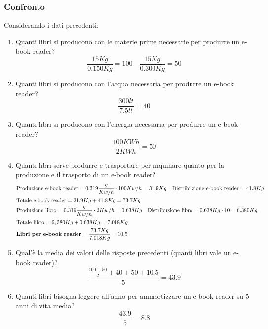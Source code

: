 \subsubsection{Confronto}
Considerando i dati precedenti:
\begin{enumerate}
	\item Quanti libri si producono con le materie prime necessarie per produrre un e-book reader?\\
	\begin{equation*}
		\frac{15Kg}{0.150Kg} = 100 \quad \frac{15Kg}{0.300Kg}=50
	\end{equation*}
	\item Quanti libri si producono con l'acqua necessaria per produrre un e-book reader?\\
	\begin{equation*}
		\frac{300lt}{7.5lt} = 40
	\end{equation*}
	\item Quanti libri si producono con l'energia necessaria per produrre un e-book reader?\\
	\begin{equation*}
		\frac{100KWh}{2KWh} = 50
	\end{equation*}
	\item Quanti libri serve produrre e trasportare per inquinare quanto per la produzione e il trasporto di un e-book reader?\\
	\begin{equation*}
		\begin{split}
			&\text{Produzione e-book reader}=0.319\frac{g}{Kw/h} \cdot 100Kw/h = 31.9Kg \quad \text{Distribuzione e-book reader}=41.8 Kg \\
			&\text{Totale e-book reader}=31.9Kg + 41.8Kg = 73.7 Kg \\
			&\text{Produzione libro}=0.319 \frac{g}{Kw/h} \cdot 2Kw/h = 0.638Kg \quad  \text{Distribuzione libro}= 0.638Kg \cdot 10 = 6.380Kg\\
			&\text{Totale libro}=6,380Kg + 0.638 Kg = 7.018Kg \\
			& \text{\textbf{Libri per e-book reader}}=\frac{73.7Kg}{7.018Kg}=10.5
		\end{split}
	\end{equation*}
	\item Qual'è la media dei valori delle risposte precedenti (quanti libri vale un e-book reader)?
	\begin{equation*}
		\frac{\frac{100+50}{2} + 40 + 50 + 10.5}{5} = 43.9
	\end{equation*}
	\item Quanti libri bisogna leggere all'anno per ammortizzare un e-book reader su 5 anni di vita media?
	\begin{equation*}
		\frac{43.9}{5} = 8.8
	\end{equation*}
\end{enumerate}

